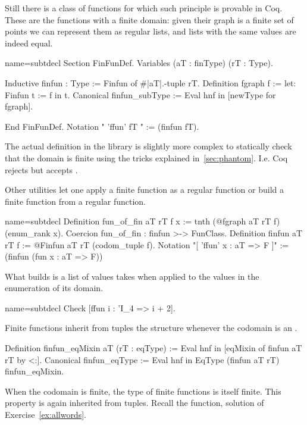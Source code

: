 Still there is a class of functions for which such principle is
provable in Coq.  These are the functions with a finite domain:
given their graph is a finite set of points we can represent them
as regular lists, and lists with the same values are indeed equal.

\begin{coq}{name=subtdecl}{}
Section FinFunDef.
Variables (aT : finType) (rT : Type).

Inductive finfun : Type := Finfun of #|aT|.-tuple rT.
Definition fgraph f := let: Finfun t := f in t.
Canonical finfun_subType := Eval hnf in [newType for fgraph].

End FinFunDef.
Notation "{ 'ffun' fT }" := (finfun fT).
\end{coq}

The actual definition in the \mcbMC{} library is slightly more complex
to statically check that the domain is finite using the tricks
explained in~\ref{sec:phantom}.  I.e. Coq rejects 
but accepts .

Other utilities let one apply a finite function as a regular function
or build a finite function from a regular function.

\begin{coq}{name=subtdecl}{}
Definition fun_of_fin aT rT f x := tnth (@fgraph aT rT f) (enum_rank x).
Coercion fun_of_fin : finfun >-> FunClass.
Definition finfun aT rT f := @Finfun aT rT (codom_tuple f).
Notation "[ 'ffun' x : aT => F ]" := (finfun (fun x : aT => F))
\end{coq}

What  builds is a list of values  takes
when applied to the values in the enumeration of its domain.

\begin{coq}{name=subtdecl}{}
Check [ffun i : 'I_4 => i + 2].
\end{coq}

Finite functions inherit from tuples the  structure
whenever the codomain is an .

\begin{coq}{}{}
Definition finfun_eqMixin aT (rT : eqType) :=
  Eval hnf in [eqMixin of finfun aT rT by <:].
Canonical finfun_eqType :=
  Eval hnf in EqType (finfun aT rT) finfun_eqMixin.
\end{coq}

When the codomain is finite, the type of finite functions is itself
finite.  This property is again inherited from tuples.  Recall
the  function, solution of Exercise~\ref{ex:allwords}.

